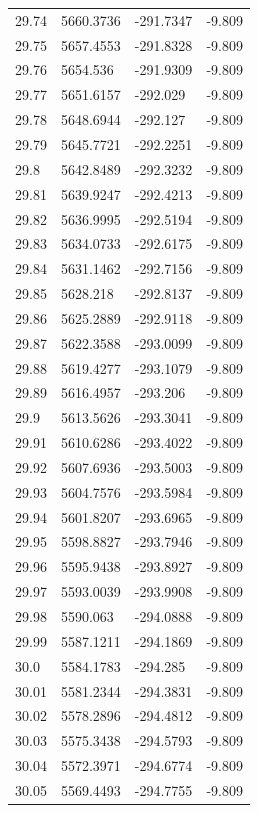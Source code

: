 \begin{table}[H]
\begin{tabular}{llll}
29.74 & 5660.3736 & -291.7347 & -9.809 \\
29.75 & 5657.4553 & -291.8328 & -9.809 \\
29.76 & 5654.536 & -291.9309 & -9.809 \\
29.77 & 5651.6157 & -292.029 & -9.809 \\
29.78 & 5648.6944 & -292.127 & -9.809 \\
29.79 & 5645.7721 & -292.2251 & -9.809 \\
29.8 & 5642.8489 & -292.3232 & -9.809 \\
29.81 & 5639.9247 & -292.4213 & -9.809 \\
29.82 & 5636.9995 & -292.5194 & -9.809 \\
29.83 & 5634.0733 & -292.6175 & -9.809 \\
29.84 & 5631.1462 & -292.7156 & -9.809 \\
29.85 & 5628.218 & -292.8137 & -9.809 \\
29.86 & 5625.2889 & -292.9118 & -9.809 \\
29.87 & 5622.3588 & -293.0099 & -9.809 \\
29.88 & 5619.4277 & -293.1079 & -9.809 \\
29.89 & 5616.4957 & -293.206 & -9.809 \\
29.9 & 5613.5626 & -293.3041 & -9.809 \\
29.91 & 5610.6286 & -293.4022 & -9.809 \\
29.92 & 5607.6936 & -293.5003 & -9.809 \\
29.93 & 5604.7576 & -293.5984 & -9.809 \\
29.94 & 5601.8207 & -293.6965 & -9.809 \\
29.95 & 5598.8827 & -293.7946 & -9.809 \\
29.96 & 5595.9438 & -293.8927 & -9.809 \\
29.97 & 5593.0039 & -293.9908 & -9.809 \\
29.98 & 5590.063 & -294.0888 & -9.809 \\
29.99 & 5587.1211 & -294.1869 & -9.809 \\
30.0 & 5584.1783 & -294.285 & -9.809 \\
30.01 & 5581.2344 & -294.3831 & -9.809 \\
30.02 & 5578.2896 & -294.4812 & -9.809 \\
30.03 & 5575.3438 & -294.5793 & -9.809 \\
30.04 & 5572.3971 & -294.6774 & -9.809 \\
30.05 & 5569.4493 & -294.7755 & -9.809 \\

\end{tabular}
\end{table}
